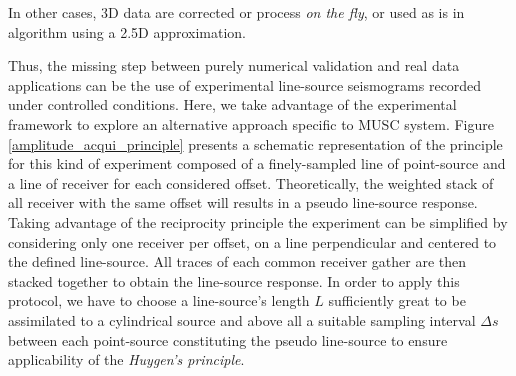 \documentclass[manuscript,revised]{geophysics}
\begin{document}
\noindent In other cases, 3D data are corrected or process \textit{on the fly}, or used as is in algorithm using a 2.5D approximation.

\noindent Thus, the missing step between purely numerical validation and real data applications can be the use of experimental line-source seismograms recorded under controlled conditions. Here, we take advantage of the experimental framework to explore an alternative approach specific to MUSC system. Figure \ref{amplitude_acqui_principle} presents a schematic representation of the principle for this kind of experiment composed of a finely-sampled line of point-source and a line of receiver for each considered offset. Theoretically, the weighted stack of all receiver with the same offset will results in a pseudo line-source response. Taking advantage of the reciprocity principle the experiment can be simplified by considering only one receiver per offset, on a line perpendicular and centered to the defined line-source. All traces of each common receiver gather are then stacked together to obtain the line-source response. In order to apply this protocol, we have to choose a line-source's length $L$ sufficiently great to be assimilated to a cylindrical source and above all a suitable sampling interval $\Delta s$ between each point-source constituting the pseudo line-source to ensure applicability of the \textit{Huygen's principle}. 
\end{document}

